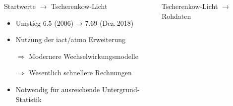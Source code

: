 \documentclass[aspectratio=1610, 9pt]{beamer}
\begin{document}
\begin{frame}[c]
  \begin{columns}[onlytextwidth, t]
    \begin{column}{0.475\textwidth}%
      {\huge Startwerte $→$ Tscherenkow-Licht}

      \begin{center}
      \end{center}
      \begin{itemize}
        \item Umstieg 6.5 (2006) → 7.69 (Dez.\,2018)
        \item Nutzung der iact/atmo Erweiterung
        \item[$⇒$] Modernere Wechselwirkungsmodelle
        \item[$⇒$] Wesentlich schnellere Rechnungen
        \item Notwendig für ausreichende Untergrund-Statistik
      \end{itemize}
    \end{column}%
    \hfill
    \begin{column}{0.475\textwidth}%
      {\huge Tscherenkow-Licht $→$ Rohdaten}


\end{column}
\end{columns}
\end{frame}
\end{document}
